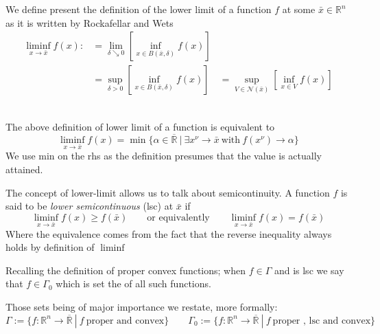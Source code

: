 \begin{definition}
We define present the definition of the lower limit of a function $f$ at some
$\bar x\in\mathbb R^n$ as it is written by Rockafellar and Wets
\autocite{rockafellar2009variational}
\begin{align*}
	\liminf_{x\rightarrow \bar x} f(x) :&= \lim_{\delta \searrow 0}
	\left[\inf_{x\in B(\bar x,\delta)}f(x)\right]\\[2ex]
		&=\sup_{\delta >0}\left[\inf_{x\in B(\bar x,\delta)}f(x)\right]
		\quad = \sup_{V\in \mathcal{N}(\bar x)}\left[\inf_{x\in
		V}f(x)\right]
\end{align*}
\end{definition}
\begin{prop}
	\autocite{rockafellar2009variational}\\
The above definition of lower limit of a function is equivalent to
\begin{equation*}
	\liminf_{x\rightarrow\bar x}f(x) = \min\{\alpha\in\overline{\mathbb R}\ 
		| \ \exists x^{\nu} \rightarrow \bar x \ \text{with}
	\ f(x^{\nu})\rightarrow \alpha\} 
\end{equation*} We use min on the rhs as the definition presumes that the value
is actually attained.
\end{prop}
%
\begin{definition}
The concept of lower-limit allows us to talk about semicontinuity. 
A function $f$ is said to be \emph{lower semicontinuous} (lsc) at $\bar x$  if
\begin{equation*}
	\liminf_{x\rightarrow\bar x}f(x) \geq f(\bar x) 
	\qquad \text{or equivalently} \qquad 
	\liminf_{x\rightarrow\bar x}f(x)=f(\bar x)
\end{equation*}
Where the equivalence comes from the fact that the reverse inequality always
holds by definition of $\liminf$
\end{definition}
%
\begin{definition}
Recalling the definition of proper convex functions; when $f\in\Gamma$ and is
lsc we say that $f\in \Gamma_0$ which is set the of all such functions.
\end{definition} Those sets being of major importance we restate, more
formally:
\begin{equation*}
	\Gamma:= \{f:\mathbb R^n \longrightarrow \mathbb \overline{\mathbb R} \
	| \ f \ \text{proper and convex}\}
	\qquad \Gamma_0 := 
	\{f:\mathbb R^n \longrightarrow \mathbb \overline{\mathbb R} \
	| \ f \ \text{proper , lsc and convex}\}
\end{equation*}
